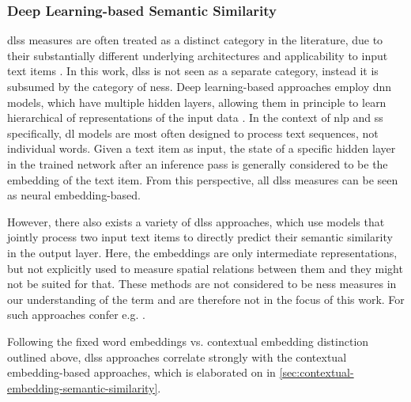 \documentclass[11pt, numbers=noenddot]{scrreprt}
\let\citef\cite  %
\let\cite\parencite  %
\begin{document}
\subsubsection{Deep Learning-based Semantic Similarity}
\label{sec:deep-learning-based-semantic-similarity}
\gls{dlss} measures are often treated as a distinct category in the literature, due to their substantially different underlying architectures and applicability to input text items \cite{harispeSemanticSimilarityNatural2015, chandrasekaranEvolutionSemanticSimilarity2021, hanSurveyTechniquesApplications2021, zadSurveyDeepLearning2021}. 
In this work, \gls{dlss} is not seen as a separate category, instead it is subsumed by the category of \gls{ness}. Deep learning-based approaches employ \gls{dnn} models, which have multiple hidden layers, allowing them in principle to learn hierarchical of representations of the input data \cite{goodfellowDeepLearning2016}. In the context of \gls{nlp} and \gls{ss} specifically, \gls{dl} models are most often designed to process text sequences, not individual words. Given a text item as input, the state of a specific hidden layer in the trained network after an inference pass is generally considered to be the embedding of the text item. From this perspective, all \gls{dlss} measures can be seen as neural embedding-based. 

However, there also exists a variety of \gls{dlss} approaches, which use models that jointly process two input text items to directly predict their semantic similarity in the output layer. Here, the embeddings are only intermediate representations, but not explicitly used to measure spatial relations between them and they might not be suited for that. These methods are not considered to be \gls{ness} measures in our understanding of the term and are therefore not in the focus of this work. For such approaches confer e.g. \citef{taiImprovedSemanticRepresentations2015, hePairwiseWordInteraction2016, shaoHCTISemEval2017Task2017, tianECNUSemEval2017Task2017, wangSentenceSimilarityLearning2017, lopez-gazpioWordNgramAttention2019, tienSentenceModelingMultiple2019, tienSentenceModelingMultiple2019a, zhengDetectionMedicalText2019}.

Following the fixed word embeddings vs. contextual embedding distinction outlined above, \gls{dlss} approaches correlate strongly with the contextual embedding-based approaches, which is elaborated on in \cref{sec:contextual-embedding-semantic-similarity}.
\end{document}
